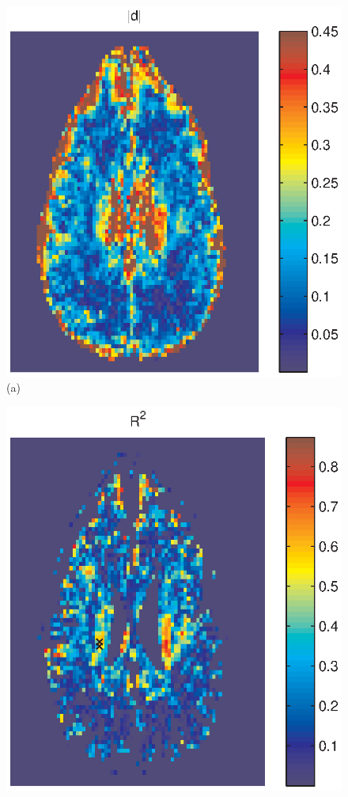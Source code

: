 \documentclass[authoryear,preprint,12pt]{elsarticle}
\begin{document}
\begin{figure}[p]
  \begin{center}
    \begin{minipage}[]{.30\textwidth}
      \centering
      \includegraphics[width=\textwidth]{absd.eps}
      (a)
      \end{minipage}
      \begin{minipage}[]{.30\textwidth}
      \centering
      \includegraphics[width=\textwidth]{Rsqnew1typ2.eps}

\end{minipage}
\end{center}
\end{figure}
\end{document}
